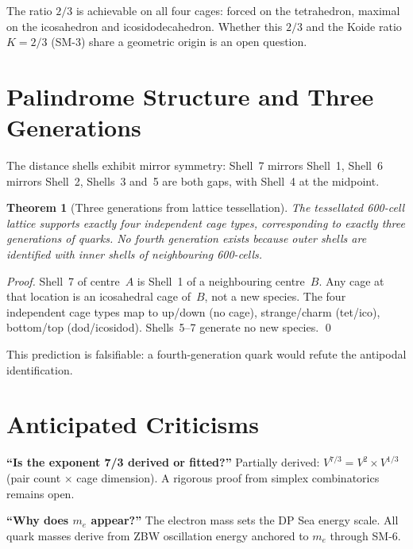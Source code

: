 \documentclass[11pt,letterpaper]{article}
\newtheorem{theorem}{Theorem}[section]
\begin{document}
The ratio $2/3$ is achievable on all four cages: forced on the
tetrahedron, maximal on the icosahedron and icosidodecahedron.
Whether this $2/3$ and the Koide ratio $K = 2/3$ (SM-3) share a
geometric origin is an open question.

\section{Palindrome Structure and Three Generations}
\label{sec:palindrome}

The distance shells exhibit mirror symmetry: Shell~7 mirrors
Shell~1, Shell~6 mirrors Shell~2, Shells~3 and~5 are both gaps,
with Shell~4 at the midpoint.

\begin{theorem}[Three generations from lattice tessellation]
\label{thm:generations}
The tessellated 600-cell lattice supports exactly four independent
cage types, corresponding to exactly three generations of quarks.
No fourth generation exists because outer shells are identified
with inner shells of neighbouring 600-cells.
\end{theorem}

\begin{proof}
Shell~7 of centre~$A$ is Shell~1 of a neighbouring centre~$B$.
Any cage at that location is an icosahedral cage of~$B$, not a
new species.  The four independent cage types map to up/down
(no cage), strange/charm (tet/ico), bottom/top (dod/icosidod).
Shells~5--7 generate no new species. \qed
\end{proof}

This prediction is falsifiable: a fourth-generation quark would
refute the antipodal identification.

\section{Anticipated Criticisms}
\label{sec:criticisms}

\textbf{``Is the exponent 7/3 derived or fitted?''}
Partially derived: $V^{7/3} = V^2 \times V^{1/3}$ (pair count
$\times$ cage dimension).  A rigorous proof from simplex
combinatorics remains open.

\textbf{``Why does $m_e$ appear?''}
The electron mass sets the DP Sea energy scale.  All quark masses
derive from ZBW oscillation energy anchored to $m_e$ through SM-6.
\end{document}
